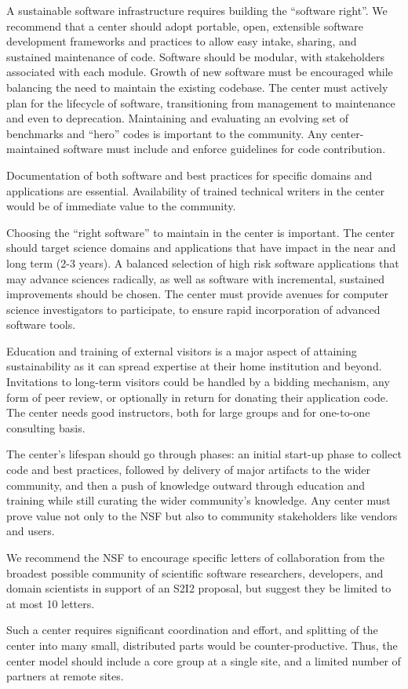 A sustainable software infrastructure requires building the “software right”. We recommend that a center should adopt portable, open, extensible software development frameworks and practices to allow easy intake, sharing, and sustained maintenance of code. Software should be modular, with stakeholders associated with each module. Growth of new software must be encouraged while balancing the need to maintain the existing codebase. The center must actively plan for the lifecycle of software, transitioning from management to maintenance and even to deprecation. Maintaining and evaluating an evolving set of benchmarks and “hero” codes is important to the community. Any center-maintained software must include and enforce guidelines for code contribution.

Documentation of both software and best practices for specific domains and applications are essential. Availability of trained technical writers in the center would be of immediate value to the community.

Choosing the “right software” to maintain in the center is important. The center should target science domains and applications that have impact in the near and long term (2-3 years). A balanced selection of high risk software applications that may advance sciences radically, as well as software with incremental, sustained improvements should be chosen. The center must provide avenues for computer science investigators to participate, to ensure rapid incorporation of advanced software tools.

Education and training of external visitors is a major aspect of attaining sustainability as it can spread expertise at their home institution and beyond. Invitations to long-term visitors could be handled by a bidding mechanism, any form of peer review, or optionally in return for donating their application code. The center needs good instructors, both for large groups and for one-to-one consulting basis.

The center’s lifespan should go through phases: an initial start-up phase to collect code and best practices, followed by delivery of major artifacts to the wider community, and then a push of knowledge outward through education and training while still curating the wider community’s knowledge. Any center must prove value not only to the NSF but also to community stakeholders like vendors and users.

We recommend the NSF to encourage specific letters of collaboration from the broadest possible community of scientific software researchers, developers, and domain scientists in support of an S2I2 proposal, but suggest they be limited to at most 10 letters.

Such a center requires significant coordination and effort, and splitting of the center into many small, distributed parts would be counter-productive.  Thus, the center model should include a core group at a single site, and a limited number of partners at remote sites. 
